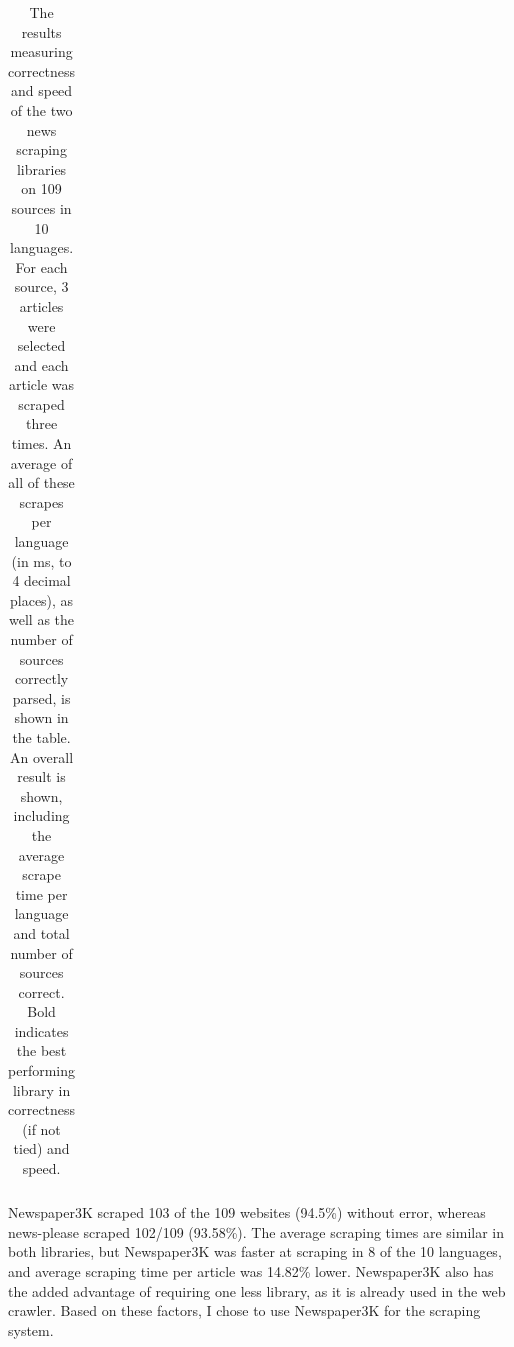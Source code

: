 \documentclass{l4proj}
\begin{document}
\begin{table}[]
\begin{tabular}{llllll}
\end{tabular}
\caption{The results measuring correctness and speed of the two news scraping libraries on 109 sources in 10 languages. For each source, 3 articles were selected and each article was scraped three times. An average of all of these scrapes per language (in ms, to 4 decimal places), as well as the number of sources correctly parsed, is shown in the table. An overall result is shown, including the average scrape time per language and total number of sources correct. Bold indicates the best performing library in correctness (if not tied) and speed.}
\label{table:scraper-library-results}
\end{table}

Newspaper3K scraped 103 of the 109 websites (94.5\%) without error, whereas news-please scraped 102/109 (93.58\%). The average scraping times are similar in both libraries, but Newspaper3K was faster at scraping in 8 of the 10 languages, and average scraping time per article was 14.82\% lower. Newspaper3K also has the added advantage of requiring one less library, as it is already used in the web crawler. Based on these factors, I chose to use Newspaper3K for the scraping system.
\end{document}
